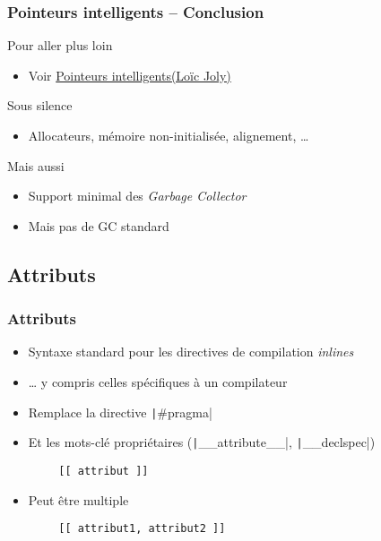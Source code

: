 \documentclass[C++.tex]{subfiles}
\begin{document}
\begin{frame}[fragile]
	\frametitle{Pointeurs intelligents -- Conclusion}
	\begin{block}{Pour aller plus loin}
		\begin{itemize}
			\item Voir \href{http://loic-joly.developpez.com/tutoriels/cpp/smart-pointers/}{Pointeurs intelligents\linklogo (Loïc Joly)}
		\end{itemize}
	\end{block}

	\begin{block}{Sous silence}
		\begin{itemize}
			\item Allocateurs, mémoire non-initialisée, alignement, \ldots{}
		\end{itemize} 
	\end{block}

	\begin{block}{Mais aussi}
		\begin{itemize}
			\item Support minimal des \textit{Garbage Collector}


			\item Mais pas de GC standard
		\end{itemize}
	\end{block}
\end{frame}

\subsection*{Attributs}
\begin{frame}[fragile]
	\frametitle{Attributs}
	\begin{itemize}
		\item Syntaxe standard pour les directives de compilation \textit{inlines}
		\item \ldots{} y compris celles spécifiques à un compilateur
		\item Remplace la directive \texttt|#pragma|
		\item Et les mots-clé propriétaires (\texttt|__attribute__|, \texttt|__declspec|)
	\end{itemize}

	\begin{verbatim}
		[[ attribut ]]
	\end{verbatim}

	\begin{itemize}
		\item Peut être multiple
	\end{itemize}

	\begin{verbatim}
		[[ attribut1, attribut2 ]]
	\end{verbatim}
\end{frame}
\end{document}
